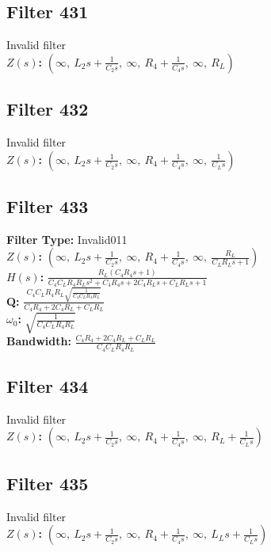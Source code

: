 \documentclass{article}
\begin{document}
\subsection*{Filter 431}
Invalid filter \\ 
\textbf{$Z(s)$:} $\left( \infty, \  L_{2} s + \frac{1}{C_{2} s}, \  \infty, \  R_{4} + \frac{1}{C_{4} s}, \  \infty, \  R_{L}\right)$ \\ 
\subsection*{Filter 432}
Invalid filter \\ 
\textbf{$Z(s)$:} $\left( \infty, \  L_{2} s + \frac{1}{C_{2} s}, \  \infty, \  R_{4} + \frac{1}{C_{4} s}, \  \infty, \  \frac{1}{C_{L} s}\right)$ \\ 
\subsection*{Filter 433}
\textbf{Filter Type:} Invalid011 \\ 
\textbf{$Z(s)$:} $\left( \infty, \  L_{2} s + \frac{1}{C_{2} s}, \  \infty, \  R_{4} + \frac{1}{C_{4} s}, \  \infty, \  \frac{R_{L}}{C_{L} R_{L} s + 1}\right)$ \\ 
\textbf{$H(s)$:} $\frac{R_{L} \left(C_{4} R_{4} s + 1\right)}{C_{4} C_{L} R_{4} R_{L} s^{2} + C_{4} R_{4} s + 2 C_{4} R_{L} s + C_{L} R_{L} s + 1}$ \\ 
\textbf{Q:} $\frac{C_{4} C_{L} R_{4} R_{L} \sqrt{\frac{1}{C_{4} C_{L} R_{4} R_{L}}}}{C_{4} R_{4} + 2 C_{4} R_{L} + C_{L} R_{L}}$ \\ 
\textbf{$\omega_0$:} $\sqrt{\frac{1}{C_{4} C_{L} R_{4} R_{L}}}$ \\ 
\textbf{Bandwidth:} $\frac{C_{4} R_{4} + 2 C_{4} R_{L} + C_{L} R_{L}}{C_{4} C_{L} R_{4} R_{L}}$ \\ 
\subsection*{Filter 434}
Invalid filter \\ 
\textbf{$Z(s)$:} $\left( \infty, \  L_{2} s + \frac{1}{C_{2} s}, \  \infty, \  R_{4} + \frac{1}{C_{4} s}, \  \infty, \  R_{L} + \frac{1}{C_{L} s}\right)$ \\ 
\subsection*{Filter 435}
Invalid filter \\ 
\textbf{$Z(s)$:} $\left( \infty, \  L_{2} s + \frac{1}{C_{2} s}, \  \infty, \  R_{4} + \frac{1}{C_{4} s}, \  \infty, \  L_{L} s + \frac{1}{C_{L} s}\right)$ \\ 
\end{document}
